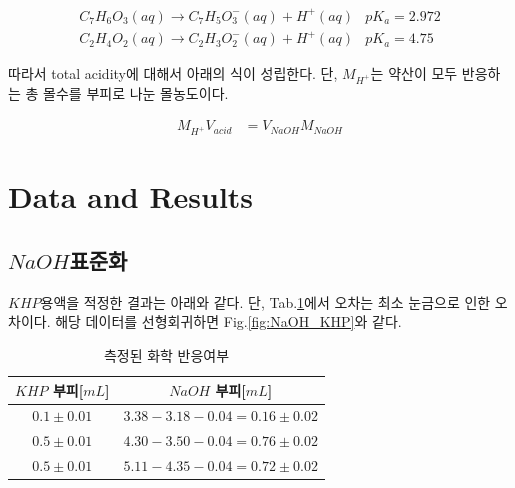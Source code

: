 \documentclass[%
 reprint,
 amsmath,amssymb,
 aps,
]{revtex4-2}
\begin{document}
\begin{align}
	C_{7}H_{6}O_{3}(aq) \rightarrow C_{7}H_{5}O_{3}^{-}(aq) + H^{+}(aq) & pK_{a}=2.972\\
	C_{2}H_{4}O_{2}(aq) \rightarrow C_{2}H_{3}O_{2}^{-}(aq) + H^{+}(aq) & pK_{a}=4.75
\end{align}

따라서 total acidity에 대해서 아래의 식이 성립한다. 단, $M_{H^{+}}$는 약산이 모두 반응하는 총 몰수를 부피로 나눈 몰농도이다.

\begin{align}
	M_{H^{+}}V_{acid} &= V_{NaOH}M_{NaOH} \label{eq:total_acid}
\end{align}

\section{\label{sec:level1}Data and Results}
\subsection{\label{sec:level2}$NaOH$표준화}
$KHP$용액을 적정한 결과는 아래와 같다. 단, Tab.\ref{tab:NaOH_KHP}에서 오차는 최소 눈금으로 인한 오차이다. 해당 데이터를 선형회귀하면 Fig.\ref{fig:NaOH_KHP}와 같다.
\begin{table}[]
\begin{tabular}{c|c} \hline \hline
$KHP$ 부피[$mL$] & $NaOH$ 부피[$mL$] \\ \hline
$0.1\pm0.01$ & $3.38 - 3.18 - 0.04 = 0.16\pm0.02$  \\ \hline
$0.5\pm0.01$ & $4.30 - 3.50 - 0.04 = 0.76\pm0.02$  \\ \hline
$0.5\pm0.01$ & $5.11-4.35 - 0.04 = 0.72\pm0.02$ \\  \hline \hline 
\end{tabular}
\caption{\label{tab:NaOH_KHP}측정된 화학 반응여부}
\end{table}
\end{document}
